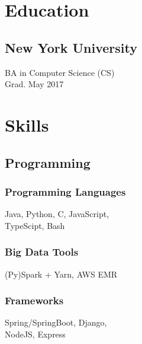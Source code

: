 \documentclass[]{two-column-resume}
\begin{document}
\begin{minipage}[t]{0.34\textwidth}

\section{Education}

\subsection{New York University}
BA in Computer Science (CS) \\
Grad. May 2017 \\
\sectionsep


\section{Skills}
\setlength{\parindent}{3ex}
\subsection{Programming}
\subsubsection{Programming Languages}
Java, Python, C, JavaScript,\\
TypeScipt, Bash
\newline

\subsubsection{Big Data Tools}
(Py)Spark + Yarn, AWS EMR
\newline

\subsubsection{Frameworks}
Spring/SpringBoot, Django,\\
NodeJS, Express
\newline


\end{minipage}
\end{document}
